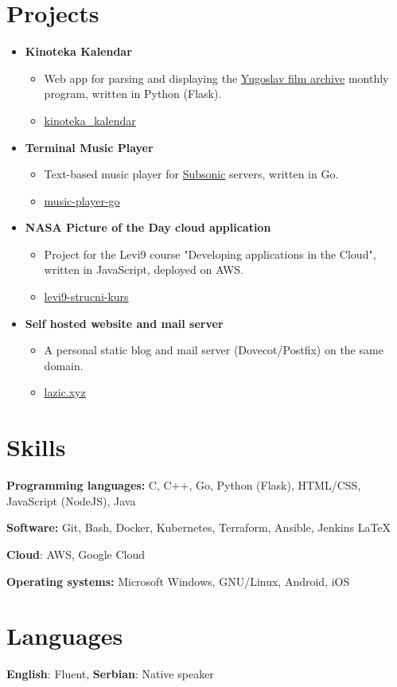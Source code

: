 \documentclass[11pt,a4paper,roman]{moderncv}        %
\begin{document}
\section{Projects}
\begin{itemize}[topsep=0em, itemsep=0pt, itemindent=-1em,font=\huge]
	\item[] \textbf{Kinoteka Kalendar}
		\begin{itemize}[noitemsep,itemindent=-1.25em,topsep=0pt]
			\item[] Web app for parsing and displaying the \href{http://kinoteka.org.rs}{Yugoslav film archive} monthly program, written in Python (Flask).
			\item[] \faGithub \href{https://github.com/vojislav/kinoteka\_kalendar}{ kinoteka\_kalendar}
	 	\end{itemize}
	\item[] \textbf{Terminal Music Player}
		\begin{itemize}[noitemsep,itemindent=-1.25em,topsep=0pt]
			\item[] Text-based music player for \href{http://www.subsonic.org}{Subsonic} servers, written in Go.
			\item[] \faGithub \href{https://github.com/vojislav/music-player-go}{ music-player-go}
	 	\end{itemize}
	 	
	 \item[] \textbf{NASA Picture of the Day cloud application}
	 	\begin{itemize}[noitemsep,itemindent=-1.25em,topsep=0pt]
	 		\item[] Project for the Levi9 course "Developing applications in the Cloud", written in JavaScript, deployed on AWS.
	 		\item[] \faGithub \href{https://github.com/vojislav/levi9-strucni-kurs}{ levi9-strucni-kurs}
	 	\end{itemize}

	\item[] \textbf{Self hosted website and mail server}
		\begin{itemize}[noitemsep,itemindent=-1.25em,topsep=0pt]
			\item[] A personal static blog and mail server (Dovecot/Postfix) on the same domain.
			\item[] \faGlobe \href{https://lazic.xyz}{ lazic.xyz}
	 	\end{itemize}
\end{itemize}

\section{Skills}
\textbf{Programming languages: } C, C++, Go, Python (Flask), HTML/CSS, JavaScript (NodeJS), Java

\textbf{Software:} Git, Bash, Docker, Kubernetes, Terraform, Ansible, Jenkins \LaTeX

\textbf{Cloud}: AWS, Google Cloud

\textbf{Operating systems: } Microsoft Windows, GNU/Linux, Android, iOS

\section{Languages}
	\textbf{English}: Fluent, \textbf{Serbian}: Native speaker
\end{document}
